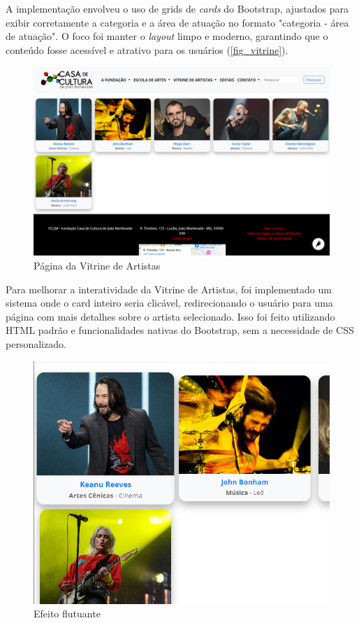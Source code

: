 A implementação envolveu o uso de grids de \textit{cards} do Bootstrap, ajustados para exibir corretamente a categoria e a área de atuação no formato "categoria - área de atuação". O foco foi manter o \textit{layout} limpo e moderno, garantindo que o conteúdo fosse acessível e atrativo para os usuários (\autoref{fig_vitrine}).

\begin{figure}[htb]
	\caption{\label{fig_vitrine}Página da Vitrine de Artistas}
	\begin{center}
	    \includegraphics[scale=0.3]{./img/vitrine_de_artistas.png}
	\end{center}
\end{figure}

Para melhorar a interatividade da Vitrine de Artistas, foi implementado um sistema onde o card inteiro seria clicável, redirecionando o usuário para uma página com mais detalhes sobre o artista selecionado. Isso foi feito utilizando \ac{HTML} padrão e funcionalidades nativas do Bootstrap, sem a necessidade de \ac{CSS} personalizado.


\begin{figure}[htb]
	\caption{\label{fig_grafico}Efeito flutuante}
	\begin{center}
	    \includegraphics[scale=0.35]{./img/vitrine_de_artistas_hover.png}
	\end{center}
\end{figure}

